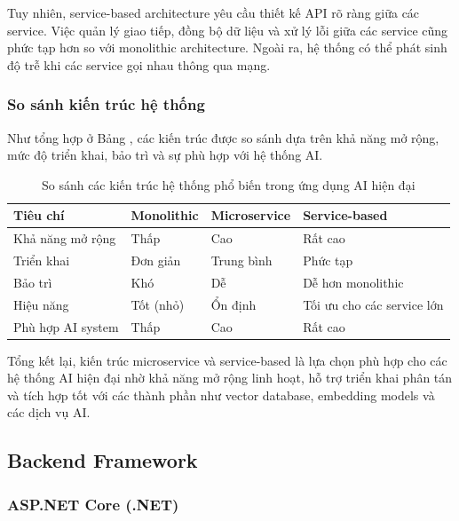 Tuy nhiên, service-based architecture yêu cầu thiết kế API rõ ràng giữa các service. Việc quản lý giao tiếp, đồng bộ dữ liệu và xử lý lỗi giữa các service cũng phức tạp hơn so với monolithic architecture. Ngoài ra, hệ thống có thể phát sinh độ trễ khi các service gọi nhau thông qua mạng.

\subsubsection{So sánh kiến trúc hệ thống}

Như tổng hợp ở Bảng , các kiến trúc được so sánh dựa trên khả năng mở rộng, mức độ triển khai, bảo trì và sự phù hợp với hệ thống AI.

\begin{table}[H]
\centering
\caption{So sánh các kiến trúc hệ thống phổ biến trong ứng dụng AI hiện đại}
\label{tab:architecture_comparison}
\renewcommand{\arraystretch}{1.3}

\begin{tabularx}{\linewidth}{|>{\raggedright\arraybackslash}X|>{\raggedright\arraybackslash}X|>{\raggedright\arraybackslash}X|>{\raggedright\arraybackslash}X|}
\hline
\textbf{Tiêu chí} & \textbf{Monolithic} & \textbf{Microservice} & \textbf{Service-based} \\ \hline
Khả năng mở rộng & Thấp & Cao & Rất cao \\ \hline
Triển khai & Đơn giản & Trung bình & Phức tạp \\ \hline
Bảo trì & Khó & Dễ & Dễ hơn monolithic \\ \hline
Hiệu năng & Tốt (nhỏ) & Ổn định & Tối ưu cho các service lớn \\ \hline
Phù hợp AI system & Thấp & Cao & Rất cao \\ \hline
\end{tabularx}
\end{table}

Tổng kết lại, kiến trúc microservice và service-based là lựa chọn phù hợp cho các hệ thống AI hiện đại nhờ khả năng mở rộng linh hoạt, hỗ trợ triển khai phân tán và tích hợp tốt với các thành phần như vector database, embedding models và các dịch vụ AI.
\subsection{Backend Framework}
\subsubsection{ASP.NET Core (.NET)}

